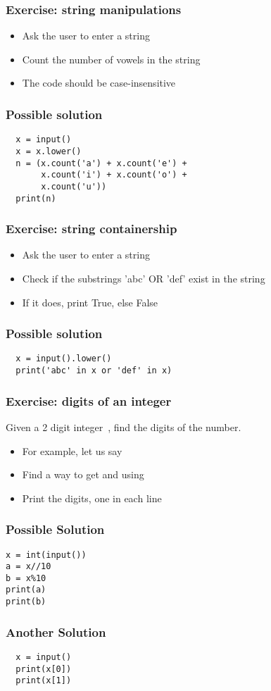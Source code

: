 \documentclass[14pt,compress]{beamer}
\begin{document}
\begin{frame}[plain]
  \frametitle{Exercise: string manipulations}
  \begin{itemize}
  \item Ask the user to enter a string
  \item Count the number of vowels in the string
  \item The code should be case-insensitive
  \end{itemize}
\end{frame}

\begin{frame}
\frametitle{Possible solution}
\begin{lstlisting}
  x = input()
  x = x.lower()
  n = (x.count('a') + x.count('e') +
       x.count('i') + x.count('o') +
       x.count('u'))
  print(n)
\end{lstlisting}
\end{frame}

\begin{frame}[plain]
  \frametitle{Exercise: string containership}
  \begin{itemize}
  \item Ask the user to enter a string
  \item Check if the substrings 'abc' OR 'def' exist in the string
  \item If it does, print True, else False
  \end{itemize}
\end{frame}

\begin{frame}
\frametitle{Possible solution}
\begin{lstlisting}
  x = input().lower()
  print('abc' in x or 'def' in x)
\end{lstlisting}
\end{frame}

\begin{frame}[plain]
  \frametitle{Exercise: digits of an integer}
  Given a 2 digit integer\ , find the digits of the number.
  \vspace*{1em}

  \begin{itemize}
  \item For example, let us say 
  \item Find a way to get  and  using 
  \item Print the digits, one in each line
  \end{itemize}
\end{frame}

\begin{frame}
  \frametitle{Possible Solution}
  \begin{lstlisting}
x = int(input())
a = x//10
b = x%10
print(a)
print(b)
\end{lstlisting}
\end{frame}

\begin{frame}
  \frametitle{Another Solution}
\begin{lstlisting}
  x = input()
  print(x[0])
  print(x[1])
\end{lstlisting}
\end{frame}
\end{document}

